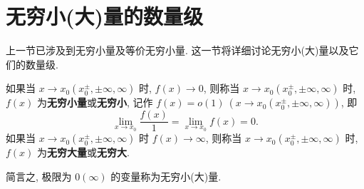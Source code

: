 \section{无穷小(大)量的数量级}\label{sec:2.3}

上一节已涉及到无穷小量及等价无穷小量. 这一节将详细讨论无穷小(大)量以及它们的数量级.

\begin{definition}\label{def:2.3.1}
如果当 $x \to x_0(x_0^{\pm}, \pm\infty, \infty)$ 时, $f(x) \to 0$, 则称当 $x \to x_0(x_0^{\pm}, \pm\infty, \infty)$ 时, $f(x)$ 为\textbf{无穷小量}或\textbf{无穷小}, 记作 $f(x) = o(1)\ (x \to x_0(x_0^{\pm}, \pm\infty, \infty))$, 即
\[
\lim_{x\to x_0}\frac{f(x)}{1} = \lim_{x\to x_0} f(x) = 0.
\]
如果当 $x \to x_0(x_0^{\pm}, \pm\infty, \infty)$ 时 $f(x) \to \infty$, 则称当 $x \to x_0(x_0^{\pm}, \pm\infty, \infty)$ 时, $f(x)$ 为\textbf{无穷大量}或\textbf{无穷大}.

简言之, 极限为 $0(\infty)$ 的变量称为无穷小(大)量.
\end{definition}

